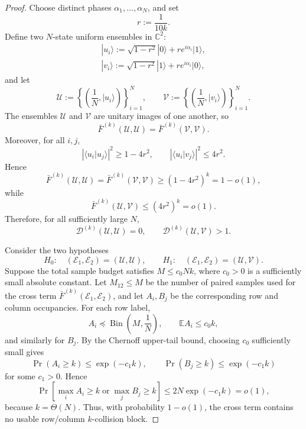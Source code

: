 \documentclass[aps,prx,reprint,superscriptaddress,amsmath,amssymb,longbibliography,floatfix]{revtex4-2}
\newcommand{\Abs}[1]{\left\lvert #1\right\rvert}
\providecommand{\ket}[1]{|#1 \rangle}
\providecommand{\braket}[2]{\langle #1|#2 \rangle}
\newcommand{\dsC}{\mathbb{C}}
\newcommand{\dsE}{\mathbb{E}}
\newcommand{\scD}{\mathcal{D}}
\newcommand{\scE}{\mathcal{E}}
\newcommand{\scU}{\mathcal{U}}
\newcommand{\scV}{\mathcal{V}}
\theoremstyle{plain}
\theoremstyle{definition}
\theoremstyle{remark}
\begin{document}
\begin{proof}
Choose distinct phases \(\alpha_1,\ldots,\alpha_N\), and set
\[
    r:=\frac1{10k}.
\]
Define two \(N\)-state uniform ensembles in \(\dsC^2\):
\begin{equation}
\begin{gathered}
\ket{u_i}
    :=
    \sqrt{1-r^2}\ket0
    +
    r e^{i\alpha_i}\ket1,
    \\
    \ket{v_i}
    :=
    \sqrt{1-r^2}\ket1
    +
    r e^{i\alpha_i}\ket0,
\end{gathered}
\label{eq:app-large-k-hard-states}
\end{equation}
and let
\[
    \scU:=\left\{\left(\frac1N,\ket{u_i}\right)\right\}_{i=1}^N,
    \qquad
    \scV:=\left\{\left(\frac1N,\ket{v_i}\right)\right\}_{i=1}^N .
\]
The ensembles \(\scU\) and \(\scV\) are unitary images of one another, so
\[
    \bar F^{(k)}(\scU,\scU)=\bar F^{(k)}(\scV,\scV).
\]
Moreover, for all \(i,j\),
\[
    \Abs{\braket{u_i}{u_j}}^2\ge 1-4r^2,
    \qquad
    \Abs{\braket{u_i}{v_j}}^2\le 4r^2.
\]
Hence
\[
    \bar F^{(k)}(\scU,\scU)
    =
    \bar F^{(k)}(\scV,\scV)
    \ge
    (1-4r^2)^k
    =
    1-o(1),
\]
while
\[
    \bar F^{(k)}(\scU,\scV)
    \le
    (4r^2)^k
    =
    o(1).
\]
Therefore, for all sufficiently large \(N\),
\begin{equation}
    \scD^{(k)}(\scU,\scU)=0,
    \qquad
    \scD^{(k)}(\scU,\scV)>1.
\label{eq:app-large-k-hard-gap}
\end{equation}

Consider the two hypotheses
\[
    H_0:\quad
    (\scE_1,\scE_2)=(\scU,\scU),
    \qquad
    H_1:\quad
    (\scE_1,\scE_2)=(\scU,\scV).
\]
Suppose the total sample budget satisfies \(M\le c_0Nk\), where \(c_0>0\) is a sufficiently
small absolute constant. Let \(M_{12}\le M\) be the number of paired samples used for the
cross term \(\bar F^{(k)}(\scE_1,\scE_2)\), and let \(A_i,B_j\) be the corresponding row
and column occupancies. For each row label,
\[
    A_i
    \preceq
    \operatorname{Bin}\!\left(M,\frac1N\right),
    \qquad
    \dsE A_i\le c_0k,
\]
and similarly for \(B_j\). By the Chernoff upper-tail bound, choosing \(c_0\) sufficiently
small gives
\[
    \Pr(A_i\ge k)\le \exp(-c_1k),
    \qquad
    \Pr(B_j\ge k)\le \exp(-c_1k)
\]
for some \(c_1>0\). Hence
\begin{equation}
    \Pr\!\left[
        \max_i A_i\ge k
        \;\text{or}\;
        \max_j B_j\ge k
    \right]
    \le
    2N\exp(-c_1k)
    =
    o(1),
\label{eq:app-large-k-no-block-bound}
\end{equation}
because \(k=\Theta(N)\). Thus, with probability \(1-o(1)\), the cross term contains no
usable row/column \(k\)-collision block.


\end{proof}
\end{document}
